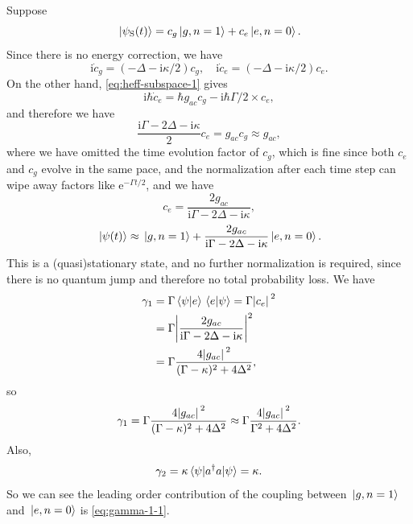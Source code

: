 \documentclass[hyperref, a4paper]{article}
\newcommand*{\ii}{\mathrm{i}}
\newcommand*{\ee}{\mathrm{e}}
\begin{document}
\begin{itemize}
Suppose 
\[
    \ket*{\psi_\text{S}(t)} = c_g \ket*{g, n=1} + c_e \ket*{e, n=0}.
\]
Since there is no energy correction, we have 
\[
    \ii \dot{c}_g = (- \Delta - \ii \kappa / 2) c_g, \quad \ii \dot{c}_e = (- \Delta - \ii \kappa / 2) c_e.
\]
On the other hand, \eqref{eq:heff-subspace-1} gives 
\[
    \ii \hbar \dot{c}_e = \hbar g_{ac} c_g - \ii \hbar \Gamma / 2 \times c_e,
\]
and therefore we have 
\[
    \frac{\ii \Gamma - 2 \Delta - \ii \kappa}{2 } c_e = g_{ac} c_g \approx g_{ac},
\]
where we have omitted the time evolution factor of $c_g$, which is fine since both $c_e$ and $c_g$ evolve in 
the same pace, and the normalization after each time step can wipe away factors like $\ee^{- \Gamma t / 2}$,
and we have 
\[
    c_e = \frac{2 g_{ac}}{\ii \Gamma - 2 \Delta - \ii \kappa},
\]
\begin{equation}
    \ket*{\psi(t)} \approx \ket*{g, n=1} + \frac{2 g_{ac}}{\ii \Gamma - 2 \Delta - \ii \kappa} \ket*{e, n=0}.
\end{equation}
This is a (quasi)stationary state, and no further normalization is required, since there is no quantum jump 
and therefore no total probability loss. We have 
\[
    \begin{aligned}
        \gamma_1 &= \Gamma \braket*{\psi}{e} \braket*{e}{\psi} = \Gamma \abs*{c_e}^2 \\
        &= \Gamma \abs{\frac{2 g_{ac}}{\ii \Gamma - 2 \Delta - \ii \kappa}}^2 \\
        &= \Gamma \frac{4 \abs*{g_{ac}}^2}{(\Gamma - \kappa)^2 + 4 \Delta^2 },
    \end{aligned}
\]
so
\begin{equation}
    \gamma_1 = \Gamma \frac{4 \abs*{g_{ac}}^2}{(\Gamma - \kappa)^2 + 4 \Delta^2 } \approx \Gamma \frac{4 \abs*{g_{ac}}^2}{\Gamma^2 + 4 \Delta^2 }.
    \label{eq:gamma-1-1}
\end{equation}
Also, 
\begin{equation}
    \gamma_2 = \kappa \expval{a^\dagger a}{\psi} = \kappa.
\end{equation}
So we can see the leading order contribution of the coupling between $\ket*{g, n=1}$ and $\ket*{e, n=0}$ is 
\eqref{eq:gamma-1-1}.


\end{itemize}
\end{document}
